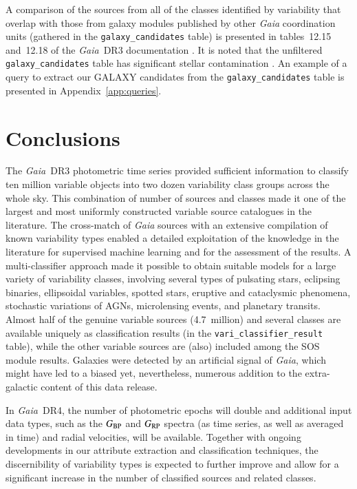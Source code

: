 \documentclass[longauth]{aa}
\def\gaia{\textit{Gaia}\xspace}
\def\gdr3{\textit{Gaia}~DR3\xspace}
\def\bp{$G_{\rm BP}$\xspace}
\def\rp{$G_{\rm RP}$\xspace}
\begin{document}
A comparison of the sources from all of the classes identified by variability that overlap with those from galaxy modules published by other \gaia coordination units (gathered in the \texttt{galaxy\_candidates} table) is presented in tables~12.15 and~12.18 of the \gdr3 documentation \citep{2022gdr3.reptE..12T}. It is noted that the unfiltered \texttt{galaxy\_candidates} table has significant stellar contamination \citep[see][where a query to select a purer sub-sample is indicated]{DR3-DPACP-101}. 
An example of a query to extract our GALAXY candidates from the \texttt{galaxy\_candidates} table is presented in Appendix~\ref{app:queries}.




\section{Conclusions\label{sec:conclusions}}

The \gdr3 photometric time series provided sufficient information to classify ten million variable objects into two dozen variability class groups across the whole sky. 
This combination of number of sources and classes made it one of the largest and most uniformly constructed variable source catalogues in the literature.
The cross-match of \gaia sources with an extensive compilation of known variability types \citep{DR3-DPACP-177} enabled a detailed exploitation of the knowledge in the literature for supervised machine learning and for the assessment of the results.
A multi-classifier approach made it possible to obtain suitable models for a large variety of variability classes, involving several types of pulsating stars, eclipsing binaries, ellipsoidal variables, spotted stars, eruptive and cataclysmic phenomena, stochastic variations of AGNs,  microlensing events, and planetary transits. Almost half of the genuine variable sources (4.7~million) and several classes are available uniquely as classification results (in the \texttt{vari\_classifier\_result} table), while the other variable sources are (also) included among the SOS module results. Galaxies were detected by an artificial signal of \gaia, which might have led to a biased yet, nevertheless, numerous addition to the extra-galactic content of this data release.


In \gaia~DR4, the number of photometric epochs will double and additional input data types, such as the \bp and \rp spectra (as time series, as well as averaged in time) and radial velocities, will be available. Together with ongoing developments in our attribute extraction and classification techniques, the discernibility of variability types is expected to further improve and allow for a significant increase in the number of classified sources and related classes. 
 
\end{document}
